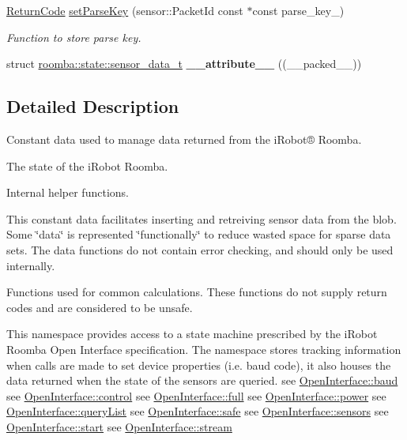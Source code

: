 \begin{DoxyCompactItemize}
\hyperlink{namespaceroomba_aff53babe0af88b1ea8b066fd18b8f23f}{Return\+Code} \hyperlink{namespaceroomba_1_1state_a67d016785f60c3014347c21ee3b5afe7}{set\+Parse\+Key} (sensor\+::\+Packet\+Id const $\ast$const parse\+\_\+key\+\_\+)
\begin{DoxyCompactList}\small\item\em Function to store parse key. \end{DoxyCompactList}\item 
\hypertarget{namespaceroomba_1_1state_a55a9c0e96dd22e4268531336e5ed2f77}{struct \hyperlink{structroomba_1_1state_1_1sensor__data__t}{roomba\+::state\+::sensor\+\_\+data\+\_\+t} {\bfseries \+\_\+\+\_\+attribute\+\_\+\+\_\+} ((\+\_\+\+\_\+packed\+\_\+\+\_\+))}\label{namespaceroomba_1_1state_a55a9c0e96dd22e4268531336e5ed2f77}

\end{DoxyCompactItemize}


\subsection{Detailed Description}
Constant data used to manage data returned from the i\+Robot® Roomba. 

The state of the i\+Robot Roomba.

Internal helper functions.

This constant data facilitates inserting and retreiving sensor data from the blob. Some \char`\"{}data\char`\"{} is represented \char`\"{}functionally\char`\"{} to reduce wasted space for sparse data sets. The data functions do not contain error checking, and should only be used internally.

Functions used for common calculations. These functions do not supply return codes and are considered to be unsafe.

This namespace provides access to a state machine prescribed by the i\+Robot Roomba Open Interface specification. The namespace stores tracking information when calls are made to set device properties (i.\+e. baud code), it also houses the data returned when the state of the sensors are queried. see \hyperlink{classroomba_1_1_open_interface_a4f90f2d77ee1a99616934bcc63044c97}{Open\+Interface\+::baud} see \hyperlink{classroomba_1_1_open_interface_a414ce50d279ed418660c29196e27f2f2}{Open\+Interface\+::control} see \hyperlink{classroomba_1_1_open_interface_a649c060ea8628d7189d5d588bf224eb4}{Open\+Interface\+::full} see \hyperlink{classroomba_1_1_open_interface_af4e1dfd388fde037cb4a43d1d0e4ab82}{Open\+Interface\+::power} see \hyperlink{classroomba_1_1_open_interface_a4a7308a7119c6a462389d9ffa3785f87}{Open\+Interface\+::query\+List} see \hyperlink{classroomba_1_1_open_interface_a3fe71d50263839dd40838af6adf5f56f}{Open\+Interface\+::safe} see \hyperlink{classroomba_1_1_open_interface_aa676703a4c79547397eaa89ddb9e207c}{Open\+Interface\+::sensors} see \hyperlink{classroomba_1_1_open_interface_a9a55a3f5a4ff10ae6452ffcec6dd80a7}{Open\+Interface\+::start} see \hyperlink{classroomba_1_1_open_interface_af7a1adea482ac71fa9057842a955af6e}{Open\+Interface\+::stream} 

